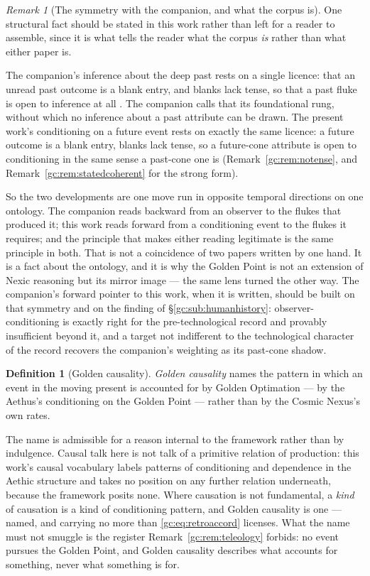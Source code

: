 \documentclass[11pt]{article}
\numberwithin{equation}{section}
\theoremstyle{plain}
\theoremstyle{definition}
\newtheorem{definition}[theorem]{Definition}
\theoremstyle{remark}
\newtheorem{remark}[theorem]{Remark}
\begin{document}
\begin{remark}[The symmetry with the companion, and what the corpus is]
\label{gc:rem:rungzero}
One structural fact should be stated in this work rather than left for a
reader to assemble, since it is what tells the reader what the corpus
\emph{is} rather than what either paper is.

The companion's inference about the deep past rests on a single licence:
that an unread past outcome is a blank entry, and blanks lack tense, so
that a past fluke is open to inference at all
\cite{Aethus, NexicFoundation}. The companion calls that its
foundational rung, without which no inference about a past attribute can
be drawn. The present work's conditioning on a future event rests on
exactly the same licence: a future outcome is a blank entry, blanks lack
tense, so a future-cone attribute is open to conditioning in the same
sense a past-cone one is (Remark~\ref{gc:rem:notense}, and
Remark~\ref{gc:rem:statedcoherent} for the strong form).

So the two developments are one move run in opposite temporal directions
on one ontology. The companion reads backward from an observer to the
flukes that produced it; this work reads forward from a conditioning
event to the flukes it requires; and the principle that makes either
reading legitimate is the same principle in both. That is not a
coincidence of two papers written by one hand. It is a fact about the
ontology, and it is why the Golden Point is not an extension of Nexic
reasoning but its mirror image --- the same lens turned the other way.
The companion's forward pointer to this work, when it is written, should
be built on that symmetry and on the finding of
\S\ref{gc:sub:humanhistory}: observer-conditioning is exactly right for
the pre-technological record and provably insufficient beyond it, and a
target not indifferent to the technological character of the record
recovers the companion's weighting as its past-cone shadow.
\end{remark}

\begin{definition}[Golden causality]\label{gc:def:goldencausality}
\emph{Golden causality} names the pattern in which an event in the moving
present is accounted for by Golden Optimation --- by the Aethus's
conditioning on the Golden Point --- rather than by the Cosmic Nexus's
own rates.
\end{definition}

The name is admissible for a reason internal to the framework rather than
by indulgence. Causal talk here is not talk of a primitive relation of
production: this work's causal vocabulary labels patterns of conditioning
and dependence in the Aethic structure and takes no position on any
further relation underneath, because the framework posits none. Where
causation is not fundamental, a \emph{kind} of causation is a kind of
conditioning pattern, and Golden causality is one --- named, and carrying
no more than \eqref{gc:eq:retroaccord} licenses. What the name must not
smuggle is the register Remark~\ref{gc:rem:teleology} forbids: no event
pursues the Golden Point, and Golden causality describes what accounts
for something, never what something is for.
\end{document}
